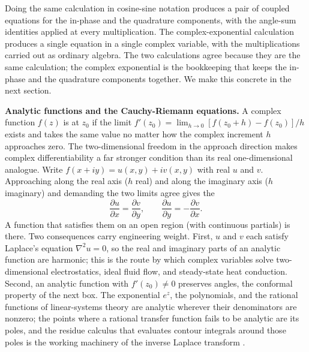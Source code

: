 Doing the same calculation in cosine-sine notation produces a
pair of coupled equations for the in-phase and the quadrature
components, with the angle-sum identities applied at every
multiplication. The complex-exponential calculation produces a
single equation in a single complex variable, with the
multiplications carried out as ordinary algebra. The two
calculations agree because they are the same calculation; the
complex exponential is the bookkeeping that keeps the in-phase
and the quadrature components together. We make this concrete in
the next section.

\begin{mastery}
\textbf{Analytic functions and the Cauchy-Riemann equations.} A
complex function $f(z)$ is  at $z_{0}$ if the
limit $f'(z_{0}) = \lim_{h \to 0}[f(z_{0} + h) - f(z_{0})]/h$ exists
and takes the same value no matter how the complex increment $h$
approaches zero. The two-dimensional freedom in the approach direction
makes complex differentiability a far stronger condition than its
real one-dimensional analogue. Write $f(x + iy) = u(x, y) + i v(x, y)$
with real $u$ and $v$. Approaching along the real axis ($h$ real) and
along the imaginary axis ($h$ imaginary) and demanding the two limits
agree gives the 
\[
\frac{\partial u}{\partial x} = \frac{\partial v}{\partial y}, \qquad
\frac{\partial u}{\partial y} = -\frac{\partial v}{\partial x}.
\]
A function that satisfies them on an open region (with continuous
partials) is  there. Two consequences carry
engineering weight. First, $u$ and $v$ each satisfy Laplace's equation
$\nabla^{2} u = 0$, so the real and imaginary parts of an analytic
function are harmonic; this is the route by which complex variables
solve two-dimensional electrostatics, ideal fluid flow, and
steady-state heat conduction. Second, an analytic function with
$f'(z_{0}) \ne 0$ preserves angles, the conformal property of the next
box. The exponential $e^{z}$, the polynomials, and the rational
functions of linear-systems theory are analytic wherever their
denominators are nonzero; the points where a rational transfer
function fails to be analytic are its poles, and the residue
calculus that evaluates contour integrals around those poles is the
working machinery of the inverse Laplace transform
\cite[chapter 2]{text:v2ch03-stein-shakarchi-complex}.
\end{mastery}

